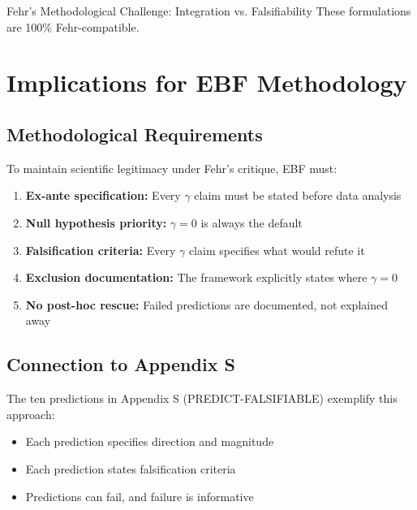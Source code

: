 \begin{chapter}{Fehr's Methodological Challenge: Integration vs. Falsifiability}
These formulations are 100\% Fehr-compatible.


\section{Implications for EBF Methodology}
\label{sec:implications}

\subsection{Methodological Requirements}

To maintain scientific legitimacy under Fehr's critique, EBF must:

\begin{enumerate}
    \item \textbf{Ex-ante specification:} Every $\gamma$ claim must be stated before data analysis

    \item \textbf{Null hypothesis priority:} $\gamma = 0$ is always the default

    \item \textbf{Falsification criteria:} Every $\gamma$ claim specifies what would refute it

    \item \textbf{Exclusion documentation:} The framework explicitly states where $\gamma = 0$

    \item \textbf{No post-hoc rescue:} Failed predictions are documented, not explained away
\end{enumerate}

\subsection{Connection to Appendix S}

The ten predictions in Appendix S (PREDICT-FALSIFIABLE) exemplify this approach:

\begin{itemize}[noitemsep]
    \item Each prediction specifies direction and magnitude
    \item Each prediction states falsification criteria
    \item Predictions can fail, and failure is informative
\end{itemize}


\end{chapter}
